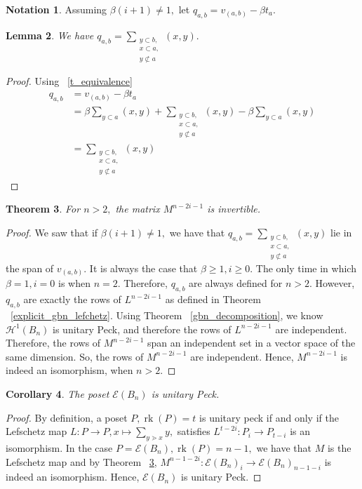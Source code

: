 \documentclass[10 pt]{amsart}
\theoremstyle{plain}
\newtheorem{thm}{Theorem}[section]
\newtheorem{lem}[thm]{Lemma}
\newtheorem{cor}[thm]{Corollary}
\theoremstyle{definition}
\newtheorem{note}[thm]{Notation}
\theoremstyle{remark}
\numberwithin{equation}{section}
\newcommand\rk{\operatorname{rk}}
\newcommand\fbn{\mathcal H}
\begin{document}
\begin{note}
Assuming $\beta(i+1) \neq 1,$ let $q_{a,b} = v_{(a, b)} - \beta t_a.$
\end{note}

\begin{lem}
We have $q_{a,b} = \sum_{\substack{{y\subset b,}\\{x \subset a,}\\{y\not\subset a}}}^{}(x, y).$
\end{lem}
\begin{proof}
Using ~\ref{t_equivalence}
\begin{align*}
	q_{a,b} &= v_{(a, b)} - \beta t_a \\
	&= \beta \sum_{y \subset a}^{}(x, y) + \sum_{\substack{{y\subset b,}\\{x \subset a,}\\{y\not\subset a}}}^{}(x, y) - \beta\sum_{y\subset a}^{}(x, y)\\
	&= \sum_{\substack{{y\subset b,}\\{x \subset a,}\\{y\not\subset a}}}^{}(x, y)
\end{align*}
\end{proof}

\begin{thm}
\label{thm:invertibility_lefschetz}
For $n >2,$ the matrix $M^{n-2i-1}$ is invertible.
\end{thm}
\begin{proof}
We saw that if $\beta(i+1) \neq 1,$ we have that $q_{a,b} = \sum_{\substack{{y\subset b,}\\{x \subset a,}\\{y\not\subset a}}}^{}(x, y)$ lie in the span of $v_{(a, b)}.$ It is always the case that $\beta \geq 1,i \geq 0.$ The only time in which $\beta = 1,i=0$ is when $n = 2.$ Therefore, $q_{a,b}$ are always defined for $n > 2.$ However, $q_{a,b}$ are exactly the rows of $L^{n-2i-1}$ as defined in Theorem ~\ref{explicit_gbn_lefchetz}. Using Theorem ~\ref{gbn_decomposition}, we know $\fbn^1(B_n)$ is unitary Peck, and therefore the rows of $L^{n-2i-1}$ are independent. Therefore, the rows of $M^{n-2i-1}$ span an independent set in a vector space of the same dimension. So, the rows of $M^{n-2i-1}$ are independent. Hence, $M^{n-2i-1}$ is indeed an isomorphism, when $n > 2.$
\end{proof}

\begin{cor}
\label{cor:unitary_peck_edge_bn}
The poset $\mathcal E(B_n)$ is unitary Peck.
\end{cor}
\begin{proof}
By definition, a poset $P,\rk(P) = t$  is unitary peck if and only if the Lefschetz map $L:P \rightarrow P,x \mapsto \sum_{y \gtrdot x} y,$ satisfies $L^{t-2i}:P_i \rightarrow P_{t-i}$ is an isomorphism. In the case $P = \mathcal E(B_n),\rk(P) = n-1,$ we have that $M$ is the Lefschetz map and by Theorem ~\ref{thm:invertibility_lefschetz}, $M^{n-1-2i}:\mathcal E(B_n)_i \rightarrow \mathcal E(B_n)_{n-1-i}$ is indeed an isomorphism. Hence, $\mathcal E(B_n)$ is unitary Peck.
\end{proof}
\end{document}
